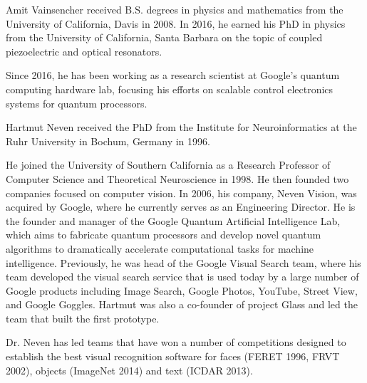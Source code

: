 \documentclass[journal]{IEEEtran}
\begin{document}
\begin{IEEEbiography}{Amit Vainsencher}  received B.S. degrees in physics and mathematics from the University of California, Davis in 2008. In 2016, he earned his PhD in physics from the University of California, Santa Barbara on the topic of coupled piezoelectric and optical resonators.

Since 2016, he has been working as a research scientist at Google’s quantum computing hardware lab, focusing his efforts on scalable control electronics systems for quantum processors.

\end{IEEEbiography}
\begin{IEEEbiography}{Hartmut Neven} received the PhD from the Institute for Neuroinformatics at the Ruhr University in Bochum, Germany in 1996.

He joined the University of Southern California as a Research Professor of Computer Science and Theoretical Neuroscience in 1998. He then founded two companies focused on computer vision. In 2006, his company,  Neven Vision, was acquired by Google, where he currently serves as an Engineering Director. He is the founder and manager of the Google Quantum Artificial Intelligence Lab, which aims to fabricate quantum processors and develop novel quantum algorithms to dramatically accelerate computational tasks for machine intelligence. Previously, he was head of the Google Visual Search team, where his team developed the visual search service that is used today by a large number of Google products including Image Search, Google Photos, YouTube, Street View, and Google Goggles. Hartmut was also a co-founder of project Glass and led the team that built the first prototype.

Dr. Neven has led teams that have won a number of competitions designed to establish the best visual recognition software for faces (FERET 1996, FRVT 2002), objects (ImageNet 2014) and text (ICDAR 2013).
\end{IEEEbiography}
\end{document}
